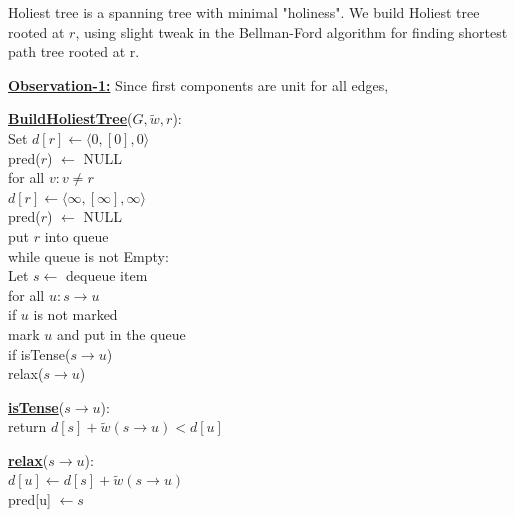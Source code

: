 \documentclass{article}
\begin{document}
\newpage

Holiest tree is a spanning tree with minimal "holiness". We build Holiest tree rooted at $r$, using slight tweak in the Bellman-Ford algorithm for finding shortest path tree rooted at r.

\textbf{\underline{Observation-1:}} Since first components are unit for all edges,

\begin{minipage}[t]{0.48\linewidth}
\begin{algorithm}
\textbf{\underline{BuildHoliestTree}}($G, \tilde w , r$): \\ \quad
Set $d[r] \leftarrow \langle 0, [0], 0 \rangle$ \\ \quad \quad
    pred($r$) $\leftarrow$ NULL \\ \quad
for all $v : v \neq r$ \\ \quad \quad
    $d[r] \leftarrow \langle \infty, [\infty], \infty \rangle$ \\ \quad \quad
    pred($r$) $\leftarrow$ NULL \\ \quad
put $r$ into queue \\ \quad
while queue is not Empty: \\ \quad \quad
    Let $s \leftarrow$ dequeue item \\ \quad \quad
    for all $u: s \rightarrow u$ \\ \qquad \quad
        if $u$ is not marked \\ \quad \qquad \quad
           mark $u$ and put in the queue \\ \qquad \quad
        if isTense($s \rightarrow u$) \\ \quad \qquad \quad
           relax($s \rightarrow u$)
\end{algorithm}
\end{minipage}
\hfill%
\begin{minipage}[t]{0.48\linewidth}
\begin{algorithm}
\textbf{\underline{isTense}}($s \rightarrow u$): \\ \quad
return $d[s] + \tilde w(s \rightarrow u) < d[u]$ \\

\end{algorithm}
\vspace{1 in}
\begin{algorithm}
\textbf{\underline{relax}}($s \rightarrow u$): \\ \quad
$d[u] \leftarrow d[s] + \tilde w(s \rightarrow u)$ \\ \quad
pred[u] $\leftarrow s$ \\
\end{algorithm}
\end{minipage}
\end{document}
